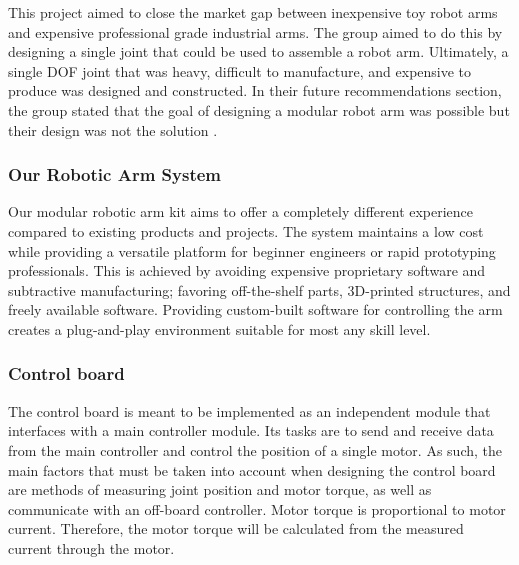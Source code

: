 This project aimed to close the market gap between inexpensive toy robot arms and expensive professional grade industrial arms. The group aimed to do this by designing a single joint that could be used to assemble a robot arm. Ultimately, a single DOF joint that was heavy, difficult to manufacture, and expensive to produce was designed and constructed. In their future recommendations section, the group stated that the goal of designing a modular robot arm was possible but their design was not the solution \cite{MRA}.

\subsubsection{Our Robotic Arm System}
Our modular robotic arm kit aims to offer a completely different experience compared to existing products and projects. The system maintains a low cost while providing a versatile platform for beginner engineers or rapid prototyping professionals. This is achieved by avoiding expensive proprietary software and subtractive manufacturing; favoring off-the-shelf parts, 3D-printed structures, and freely available software. Providing custom-built software for controlling the arm creates a plug-and-play environment suitable for most any skill level.


\subsubsection{Control board}
The control board is meant to be implemented as an independent module that interfaces with a main controller module. Its tasks are to send and receive data from the main controller and control the position of a single motor. As such, the main factors that must be taken into account when designing the control board are methods of measuring joint position and motor torque, as well as communicate with an off-board controller. Motor torque is proportional to motor current. Therefore, the motor torque will be calculated from the measured current through the motor.

